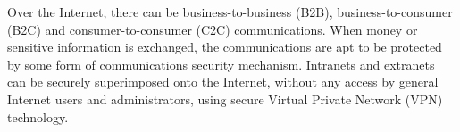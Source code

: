 \documentclass[a4paper]{article}
\begin{document}
\begin{enumerate}[label={\textbf{\Roman*.}},leftmargin=0pt,itemindent=*]
    Over the Internet, there can be business-to-business (B2B),
    business-to-consumer (B2C) and consumer-to-consumer (C2C) communications.
    When money or sensitive information is exchanged, the communications are apt
    to be protected by some form of communications security mechanism. Intranets
    and extranets can be securely superimposed onto the Internet, without any
    access by general Internet users and administrators, using secure Virtual
    Private Network (VPN) technology.

\end{enumerate}
\end{document}

